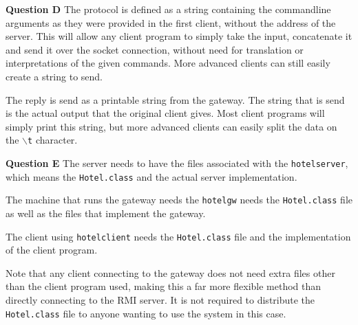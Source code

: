 \documentclass[a4paper]{article}
\begin{document}
\textbf{Question D} The protocol is defined as a string containing the commandline 
arguments as they were provided in the first client, without the address of the server.
This will allow any client program to simply take the input, concatenate it and send it
over the socket connection, without need for translation or interpretations of the given
commands. More advanced clients can still easily create a string to send.

The reply is send as a printable string from the gateway. The string that is send is the
actual output that the original client gives. Most client programs will simply print this
string, but more advanced clients can easily split the data on the \texttt{$\backslash$t} 
character.

\textbf{Question E} The server needs to have the files associated with the 
\texttt{hotelserver}, which means the \texttt{Hotel.class} and the actual 
server implementation.

The machine that runs the gateway needs the \texttt{hotelgw} needs the
\texttt{Hotel.class} file as well as the files that implement the gateway.

The client using \texttt{hotelclient} needs the \texttt{Hotel.class} file and the
implementation of the client program.

Note that any client connecting to the gateway does not need extra files other than the
client program used, making this a far more flexible method than directly connecting to 
the RMI server. It is not required to  distribute the \texttt{Hotel.class} file to anyone 
wanting to use the system in this case.
\end{document}
